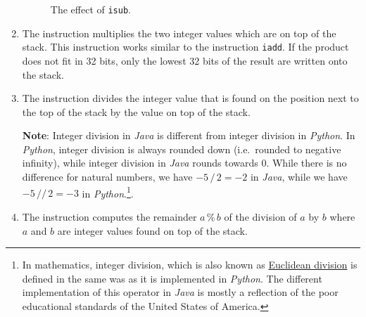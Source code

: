 \begin{enumerate}
\setlength{\unitlength}{0.5cm}
\begin{figure}[!ht]
  \centering
{}
  \caption{The effect of \texttt{isub}.}
  \label{fig:ijvm-sub}
\end{figure}

\item The instruction 
      multiplies the two integer values which are on top of the stack.  This instruction works similar to
      the instruction \texttt{iadd}.  If the product does not fit in 32 bits, only the lowest 32 bits of
      the result are written onto the stack. 
\item The instruction 
      divides the integer value that is found on the position next to the  top of the stack by the value
      on top of the stack.

      \textbf{Note}: Integer division in \textsl{Java} is different from integer division in \textsl{Python}.
      In \textsl{Python}, integer division is always rounded down (i.e.~rounded to negative infinity), while
      integer division in \textsl{Java} rounds towards $0$.  While there is no difference for natural numbers,
      we have $-5 \,\mathtt{/}\, 2 = -2$ in \textsl{Java}, while we have $-5 \,\mathtt{//}\, 2 = -3$ in
      \textsl{Python}.\footnote{
        In mathematics, integer division, which is also known as
        \href{https://en.wikipedia.org/wiki/Euclidean_division}{Euclidean division} is defined in the same was
        as it is implemented in \textsl{Python}.  The different implementation of this operator in
        \textsl{Java} is mostly a reflection of the poor educational standards of the United States of America.
      }. 
\item The instruction 
      computes the remainder $a \,\texttt{\%}\, b$ of the division of $a$ by $b$ where $a$ and $b$ are
      integer values found on top of the stack.


\end{enumerate}
